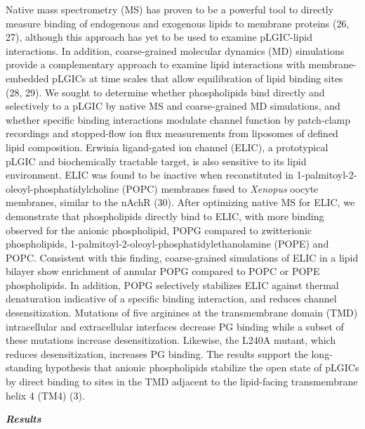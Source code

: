 Native mass spectrometry (MS) has proven to be a powerful tool to
directly measure binding of endogenous and exogenous lipids to membrane
proteins (26, 27), although this approach has yet to be used to examine
pLGIC-lipid interactions. In addition, coarse-grained molecular dynamics
(MD) simulations provide a complementary approach to examine lipid
interactions with membrane-embedded pLGICs at time scales that allow
equilibration of lipid binding sites (28, 29). We sought to determine
whether phospholipids bind directly and selectively to a pLGIC by native
MS and coarse-grained MD simulations, and whether specific binding
interactions modulate channel function by patch-clamp recordings and
stopped-flow ion flux measurements from liposomes of defined lipid
composition. Erwinia ligand-gated ion channel (ELIC), a prototypical
pLGIC and biochemically tractable target, is also sensitive to its lipid
environment. ELIC was found to be inactive when reconstituted in
1-palmitoyl-2-oleoyl-phosphatidylcholine (POPC) membranes fused to
\emph{Xenopus} oocyte membranes, similar to the nAchR (30). After
optimizing native MS for ELIC, we demonstrate that phospholipids
directly bind to ELIC, with more binding observed for the anionic
phospholipid, POPG compared to zwitterionic phospholipids,
1-palmitoyl-2-oleoyl-phosphatidylethanolamine (POPE) and POPC.
Consistent with this finding, coarse-grained simulations of ELIC in a
lipid bilayer show enrichment of annular POPG compared to POPC or POPE
phospholipids. In addition, POPG selectively stabilizes ELIC against
thermal denaturation indicative of a specific binding interaction, and
reduces channel desensitization. Mutations of five arginines at the
transmembrane domain (TMD) intracellular and extracellular interfaces
decrease PG binding while a subset of these mutations increase
desensitization. Likewise, the L240A mutant, which reduces
desensitization, increases PG binding. The results support the
long-standing hypothesis that anionic phospholipids stabilize the open
state of pLGICs by direct binding to sites in the TMD adjacent to the
lipid-facing transmembrane helix 4 (TM4) (3).

\textbf{\emph{Results}}

